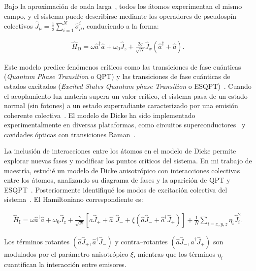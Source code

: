 \documentclass[onecolumn,notitlepage,letterpaper,aps,pra,12pt]{article}
\numberwithin{equation}{section}
\begin{document}
Bajo la aproximación de onda larga~\cite{Dicke54}, todos los átomos experimentan el mismo campo, y el sistema puede describirse mediante los operadores de pseudospín colectivos \(\hat{J}_{\mu} = \frac{1}{2}\sum_{i=1}^{N}\hat{\sigma}_{\mu}^{i}\), conduciendo a la forma:

\begin{gather}\label{Dicke colectivo}
    \hat{H}_{\text{D}} = \omega\hat{a}^{\dagger}\hat{a} + \omega_{0}\hat{J}_{z} + \frac{2g}{\sqrt{N}}\hat{J}_{x}\left( \hat{a}^{\dagger} + \hat{a} \right).
\end{gather}

Este modelo predice fenómenos críticos como las transiciones de fase cuánticas (\textit{Quantum Phase Transition} o QPT) y las transiciones de fase cuánticas de estados excitados (\textit{Excited States Quantum phase Transition} o ESQPT)~\cite{Hepp73,Sachdev99}. Cuando el acoplamiento luz-materia supera un valor crítico, el sistema pasa de un estado normal (sin fotones) a un estado superradiante caracterizado por una emisión coherente colectiva~\cite{gross1982}. El modelo de Dicke ha sido implementado experimentalmente en diversas plataformas, como circuitos superconductores~\cite{Blais04} y cavidades ópticas con transiciones Raman~\cite{Baden14}.



La inclusión de interacciones entre los átomos en el modelo de Dicke permite explorar nuevas fases y modificar los puntos críticos del sistema. En mi trabajo de maestría, estudié un modelo de Dicke anisotrópico con interacciones colectivas entre los átomos, analizando su diagrama de fases y la aparición de QPT y ESQPT~\cite{Herrera2022}. Posteriormente identifiqué los modos de excitación colectiva del sistema~\cite{herrera2024}. El Hamiltoniano correspondiente es:

\begin{gather}\label{Hamiltoniano de Dicke con interacciones}
    \hat{H}_{\text{I}} = \omega\hat{a}^{\dagger}\hat{a} + \omega_{0}\hat{J}_{z} + \frac{\gamma}{\sqrt{N}}\left[ \hat{a}\hat{J}_{+} + \hat{a}^{\dagger}\hat{J}_{-} + \xi\left( \hat{a}\hat{J}_{-} + \hat{a}^{\dagger}\hat{J}_{+} \right)  \right] + \frac{1}{N}\sum_{i=x,y,z} \eta_{i}\hat{J}_{i}^{2}.
\end{gather}

Los términos rotantes $(\hat{a}\hat{J}_{+}, \hat{a}^{\dagger}\hat{J}_{-})$ y contra–rotantes $(\hat{a}\hat{J}_{-}, \hat{a}^{\dagger}\hat{J}_{+})$ son modulados por el parámetro anisotrópico $\xi$, mientras que los términos $\eta_{i}$ cuantifican la interacción entre emisores.
\end{document}
